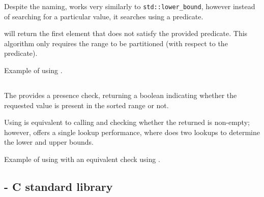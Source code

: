 Despite the naming,  works very similarly to \texttt{std::lower\-\_bound}, however instead of searching for a particular value, it searches using a predicate.


 will return the first element that does not satisfy the provided predicate. This algorithm only requires the range to be partitioned (with respect to the predicate).

\begin{codebox}[]{\href{https://compiler-explorer.com/z/WTzs4zYTq}{\ExternalLink}}
\footnotesize Example of using .
\tcblower
{}
\end{codebox}

\subsection{\texorpdfstring{}{\texttt{std::binary\_search}}}

The  provides a presence check, returning a boolean indicating whether the requested value is present in the sorted range or not.


Using  is equivalent to calling  and checking whether the returned is non-empty; however,  offers a single lookup performance, where  does two lookups to determine the lower and upper bounds.

\begin{codebox}[]{\href{https://compiler-explorer.com/z/7fP71Kjvx}{\ExternalLink}}
\footnotesize Example of using  with an equivalent check using .
\tcblower
{}
\end{codebox}

\subsection{\texorpdfstring{ - C standard library}{\texttt{bsearch} - C standard library}}


